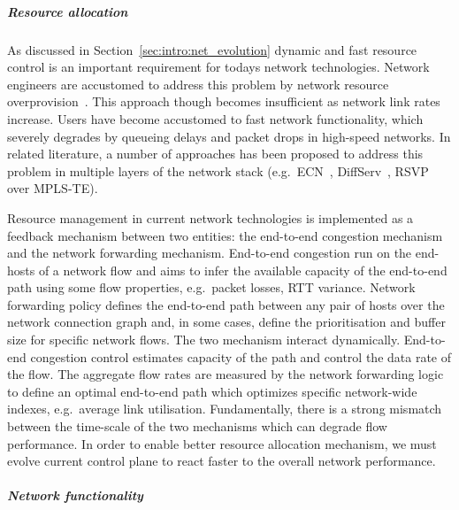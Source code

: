 \subparagraph*{Resource allocation} 
As discussed in Section~\ref{sec:intro:net_evolution} dynamic and fast resource
control is an important requirement for todays network technologies.  Network
engineers are accustomed to address this problem by network resource
overprovision~\cite{TeiSha02}. This approach though becomes insufficient as
network link rates increase. Users have become accustomed to fast network
functionality, which severely degrades by queueing delays and packet drops in
high-speed networks. In related literature, a number of approaches has been
proposed to address this problem in multiple layers of the network stack
(e.g.~ECN~\cite{RFC5562}, DiffServ~\cite{RFC2475}, RSVP over
MPLS-TE\cite{RFC3209}). 

Resource management in current network technologies is implemented as a feedback
mechanism between two entities: the end-to-end congestion mechanism and the
network forwarding mechanism. End-to-end congestion run on the end-hosts of a
network flow and aims to infer the available capacity of the end-to-end path
using some flow properties, e.g.~packet losses, RTT variance. Network forwarding
policy defines the end-to-end path between any pair of hosts over the network
connection graph and, in some cases, define the prioritisation and buffer size
for specific network flows. The two mechanism interact dynamically. End-to-end
congestion control estimates capacity of the path and control the data rate of
the flow. The aggregate flow rates are measured by the network forwarding logic
to define an optimal end-to-end path which optimizes specific network-wide
indexes, e.g.~average link utilisation. Fundamentally, there is a strong
mismatch between the time-scale of the two mechanisms which can degrade flow
performance. In order to enable better resource allocation mechanism, we must
evolve current control plane to react faster to the overall network performance. 

\subparagraph*{Network functionality} 

